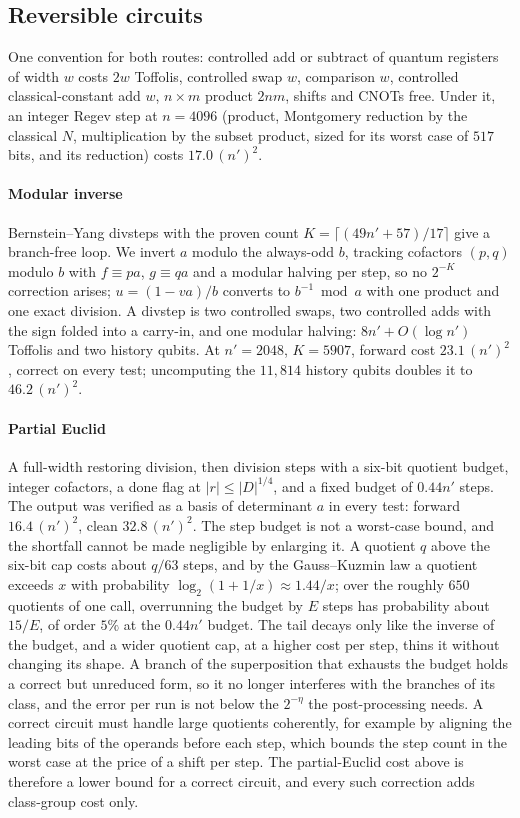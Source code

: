 \documentclass[runningheads]{llncs}
\begin{document}
\subsection{Reversible circuits}\label{sec:rev}
One convention for both routes: controlled add or subtract of quantum registers of width $w$ costs $2w$ Toffolis, controlled swap $w$, comparison $w$, controlled classical-constant add $w$, $n\times m$ product $2nm$, shifts and CNOTs free. Under it, an integer Regev step at $n=4096$ (product, Montgomery reduction by the classical $N$, multiplication by the subset product, sized for its worst case of $517$ bits, and its reduction) costs $17.0\,(n')^2$.

\paragraph{Modular inverse} Bernstein--Yang divsteps \cite{bernstein2019} with the proven count $K=\lceil(49n'+57)/17\rceil$ give a branch-free loop. We invert $a$ modulo the always-odd $b$, tracking cofactors $(p,q)$ modulo $b$ with $f\equiv pa$, $g\equiv qa$ and a modular halving per step, so no $2^{-K}$ correction arises; $u=(1-va)/b$ converts to $b^{-1}\bmod a$ with one product and one exact division. A divstep is two controlled swaps, two controlled adds with the sign folded into a carry-in, and one modular halving: $8n'+O(\log n')$ Toffolis and two history qubits. At $n'=2048$, $K=5907$, forward cost $23.1\,(n')^2$, correct on every test; uncomputing the $11{,}814$ history qubits doubles it to $46.2\,(n')^2$.

\paragraph{Partial Euclid} A full-width restoring division, then division steps with a six-bit quotient budget, integer cofactors, a done flag at $|r|\le|D|^{1/4}$, and a fixed budget of $0.44n'$ steps. The output was verified as a basis of determinant $a$ in every test: forward $16.4\,(n')^2$, clean $32.8\,(n')^2$. The step budget is not a worst-case bound, and the shortfall cannot be made negligible by enlarging it. A quotient $q$ above the six-bit cap costs about $q/63$ steps, and by the Gauss--Kuzmin law a quotient exceeds $x$ with probability $\log_2(1+1/x)\approx1.44/x$; over the roughly $650$ quotients of one call, overrunning the budget by $E$ steps has probability about $15/E$, of order $5\%$ at the $0.44n'$ budget. The tail decays only like the inverse of the budget, and a wider quotient cap, at a higher cost per step, thins it without changing its shape. A branch of the superposition that exhausts the budget holds a correct but unreduced form, so it no longer interferes with the branches of its class, and the error per run is not below the $2^{-\eta}$ the post-processing needs. A correct circuit must handle large quotients coherently, for example by aligning the leading bits of the operands before each step, which bounds the step count in the worst case at the price of a shift per step. The partial-Euclid cost above is therefore a lower bound for a correct circuit, and every such correction adds class-group cost only.
\end{document}
